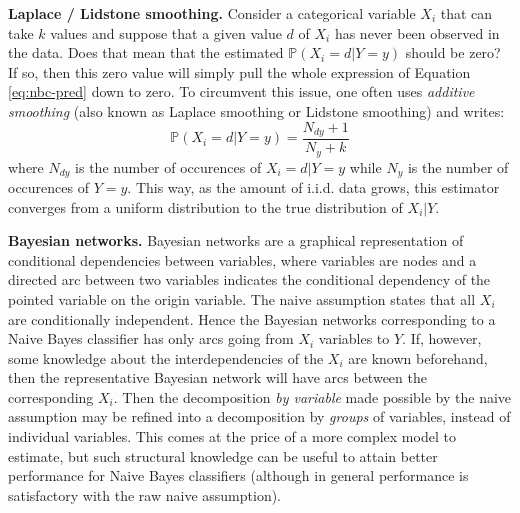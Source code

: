 \documentclass{article}
\begin{document}

\textbf{Laplace / Lidstone smoothing.} Consider a categorical variable $X_i$ that can take $k$ values and suppose that a given value $d$ of $X_i$ has never been observed in the data. Does that mean that the estimated $\mathbb{P}(X_i=d|Y=y)$ should be zero? If so, then this zero value will simply pull the whole expression of Equation \ref{eq:nbc-pred} down to zero. To circumvent this issue, one often uses \emph{additive smoothing} (also known as Laplace smoothing or Lidstone smoothing) and writes:
\begin{equation*}
\mathbb{P}(X_i=d|Y=y) = \frac{N_{dy} + 1}{N_y+k}
\end{equation*}
where $N_{dy}$ is the number of occurences of $X_i=d|Y=y$ while $N_y$ is the number of occurences of $Y=y$. This way, as the amount of i.i.d. data grows, this estimator converges from a uniform distribution to the true distribution of $X_i|Y$.

\textbf{Bayesian networks.} Bayesian networks are a graphical representation of conditional dependencies between variables, where variables are nodes and a directed arc between two variables indicates the conditional dependency of the pointed variable on the origin variable. The naive assumption states that all $X_i$ are conditionally independent. Hence the Bayesian networks corresponding to a Naive Bayes classifier has only arcs going from $X_i$ variables to $Y$. If, however, some knowledge about the interdependencies of the $X_i$ are known beforehand, then the representative Bayesian network will have arcs between the corresponding $X_i$. Then the decomposition \emph{by variable} made possible by the naive assumption may be refined into a decomposition by \emph{groups} of variables, instead of individual variables. This comes at the price of a more complex model to estimate, but such structural knowledge can be useful to attain better performance for Naive Bayes classifiers (although in general performance is satisfactory with the raw naive assumption).
\end{document}
